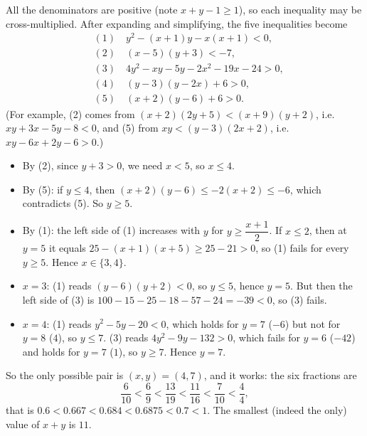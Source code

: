 All the denominators are positive (note $x+y-1\ge1$), so each inequality may be cross-multiplied. After expanding and simplifying, the five inequalities become
\begin{align*}
&(1)\quad y^2-(x+1)y-x(x+1)<0,\\
&(2)\quad (x-5)(y+3)<-7,\\
&(3)\quad 4y^2-xy-5y-2x^2-19x-24>0,\\
&(4)\quad (y-3)(y-2x)+6>0,\\
&(5)\quad (x+2)(y-6)+6>0.
\end{align*}
(For example, (2) comes from $(x+2)(2y+5)<(x+9)(y+2)$, i.e. $xy+3x-5y-8<0$, and (5) from $xy<(y-3)(2x+2)$, i.e. $xy-6x+2y-6>0$.)
\begin{itemize}
\item By (2), since $y+3>0$, we need $x<5$, so $x\le4$.
\item By (5): if $y\le4$, then $(x+2)(y-6)\le-2(x+2)\le-6$, which contradicts (5). So $y\ge5$.
\item By (1): the left side of (1) increases with $y$ for $y\ge\dfrac{x+1}{2}$. If $x\le2$, then at $y=5$ it equals $25-(x+1)(x+5)\ge25-21>0$, so (1) fails for every $y\ge5$. Hence $x\in\{3,4\}$.
\item $x=3$: (1) reads $(y-6)(y+2)<0$, so $y\le5$, hence $y=5$. But then the left side of (3) is $100-15-25-18-57-24=-39<0$, so (3) fails.
\item $x=4$: (1) reads $y^2-5y-20<0$, which holds for $y=7$ ($-6$) but not for $y=8$ ($4$), so $y\le7$. (3) reads $4y^2-9y-132>0$, which fails for $y=6$ ($-42$) and holds for $y=7$ ($1$), so $y\ge7$. Hence $y=7$.
\end{itemize}
So the only possible pair is $(x,y)=(4,7)$, and it works: the six fractions are
\[\dfrac{6}{10}<\dfrac69<\dfrac{13}{19}<\dfrac{11}{16}<\dfrac{7}{10}<\dfrac44,\]
that is $0.6<0.667<0.684<0.6875<0.7<1$. The smallest (indeed the only) value of $x+y$ is $\boxed{11}$.

